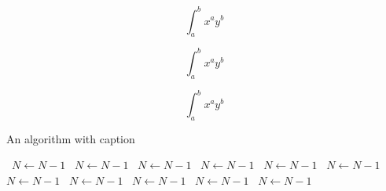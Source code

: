 \documentclass[a4paper]{article}
\begin{document}
\[ \int_{a}^{b}{x^{a}y^{b}} \]

\[ \int_{a}^{b}{x^{a}y^{b}} \]

\[ \int_{a}^{b}{x^{a}y^{b}} \]

\begin{algorithm}
\caption{An algorithm with caption}
\begin{algorithmic}
\    \State $N \gets N - 1$
\    \State $N \gets N - 1$
\    \State $N \gets N - 1$
\    \State $N \gets N - 1$
\    \State $N \gets N - 1$
\    \State $N \gets N - 1$
\    \State $N \gets N - 1$
\    \State $N \gets N - 1$
\    \State $N \gets N - 1$
\    \State $N \gets N - 1$
\    \State $N \gets N - 1$
\EndWhile
\end{algorithmic}
\end{algorithm}
\end{document}
